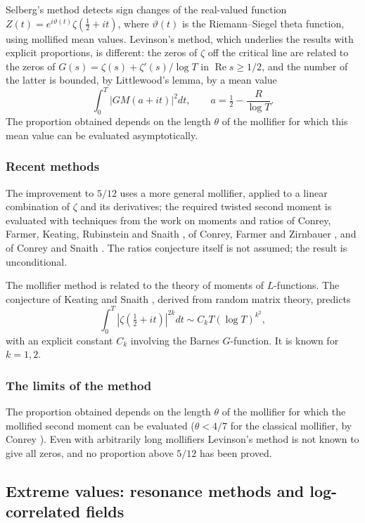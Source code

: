 \documentclass[11pt]{amsart}
\theoremstyle{definition}
\theoremstyle{remark}
\begin{document}
Selberg's method detects sign changes of the real-valued function $Z(t)=e^{i\vartheta(t)}\zeta(\tfrac12+it)$, where $\vartheta(t)$ is the Riemann--Siegel theta function, using mollified mean values. Levinson's method, which underlies the results with explicit proportions, is different: the zeros of $\zeta$ off the critical line are related to the zeros of $G(s)=\zeta(s)+\zeta'(s)/\log T$ in $\operatorname{Re}s\ge1/2$, and the number of the latter is bounded, by Littlewood's lemma, by a mean value
\[
\int_0^T \left|G M\!\left(a+it\right)\right|^2 dt,\qquad a=\tfrac12-\frac{R}{\log T}.
\]
The proportion obtained depends on the length $\theta$ of the mollifier for which this mean value can be evaluated asymptotically.

\subsubsection{Recent methods}

The improvement to $5/12$ uses a more general mollifier, applied to a linear combination of $\zeta$ and its derivatives; the required twisted second moment is evaluated with techniques from the work on moments and ratios of Conrey, Farmer, Keating, Rubinstein and Snaith \cite{cfkrs2005}, of Conrey, Farmer and Zirnbauer \cite{conrey2008}, and of Conrey and Snaith \cite{conrey2007}. The ratios conjecture itself is not assumed; the result is unconditional.

The mollifier method is related to the theory of moments of $L$-functions. The conjecture of Keating and Snaith \cite{keating2000}, derived from random matrix theory, predicts
\[
\int_0^T \left|\zeta\!\left(\tfrac{1}{2}+it\right)\right|^{2k} dt \sim C_k T (\log T)^{k^2},
\]
with an explicit constant $C_k$ involving the Barnes $G$-function. It is known for $k=1,2$.

\subsubsection{The limits of the method}

The proportion obtained depends on the length $\theta$ of the mollifier for which the mollified second moment can be evaluated ($\theta<4/7$ for the classical mollifier, by Conrey \cite{conrey1989}). Even with arbitrarily long mollifiers Levinson's method is not known to give all zeros, and no proportion above $5/12$ has been proved.

\subsection{Extreme values: resonance methods and log-correlated fields}\label{sec:resonance}
\end{document}
